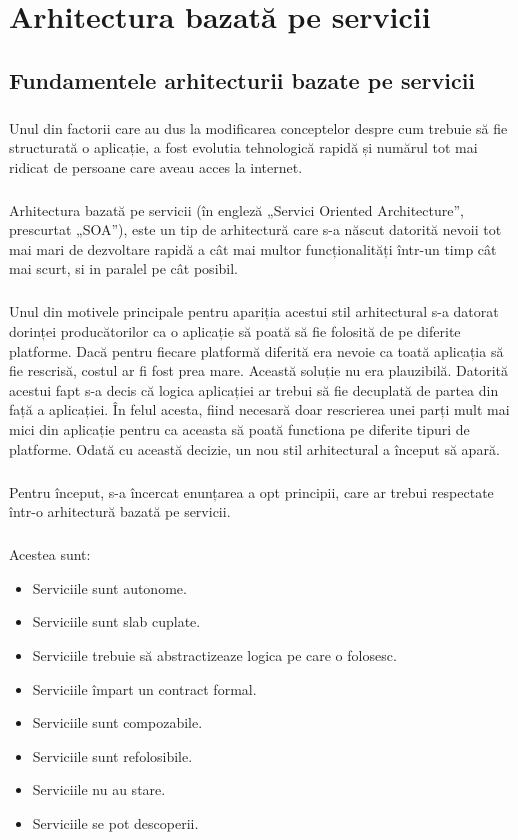 \documentclass[12pt]{report}
\begin{document}
  \chapter{Arhitectura bazată pe servicii}
  	\section{Fundamentele arhitecturii bazate pe servicii}
  	\paragraph{}Unul din factorii care au dus la modificarea conceptelor despre cum trebuie să fie structurată o aplicație, a fost evolutia tehnologică rapidă și numărul tot mai ridicat de persoane care aveau acces la internet.
	\paragraph{}Arhitectura bazată pe servicii (în engleză „Servici Oriented Architecture”, prescurtat „SOA”), este un tip de arhitectură care s-a născut datorită nevoii tot mai mari de dezvoltare rapidă a cât mai multor funcționalități într-un timp cât mai scurt, si in paralel pe cât posibil.
	\paragraph{}Unul din motivele principale pentru apariția acestui stil arhitectural s-a datorat dorinței producătorilor ca o aplicație să poată să fie folosită de pe diferite platforme. Dacă pentru fiecare platformă diferită era nevoie ca toată aplicația să fie rescrisă, costul ar fi fost prea mare. Această soluție nu era plauzibilă. Datorită acestui fapt s-a decis că logica aplicației ar trebui să fie decuplată de partea din față a aplicației. În felul acesta, fiind necesară doar rescrierea  unei parți mult mai mici din aplicație pentru ca aceasta să poată functiona pe diferite tipuri de platforme. Odată cu această decizie, un nou stil arhitectural a început să apară.\cite{erl1900service}
	\paragraph{}Pentru început, s-a încercat enunțarea a opt principii, care ar trebui respectate într-o arhitectură bazată pe servicii.\cite{erl1}
	\paragraph{}Acestea sunt:
	\begin{itemize}
	\item Serviciile sunt autonome.
	\item Serviciile sunt slab cuplate.
	\item Serviciile trebuie să abstractizeaze logica pe care o folosesc.
	\item Serviciile împart un contract formal.
	\item Serviciile sunt compozabile.
	\item Serviciile sunt refolosibile.
	\item Serviciile nu au stare.
	\item Serviciile se pot descoperii.
	\end{itemize}
\end{document}
